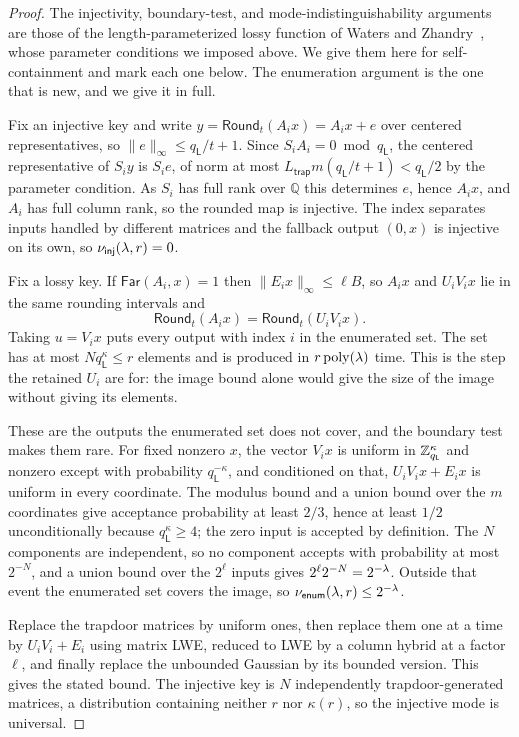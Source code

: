 \begin{proof}
The injectivity, boundary-test, and mode-indistinguishability arguments are those
of the length-parameterized lossy function of Waters and
Zhandry~\cite{C:WatZha24}, whose parameter conditions we imposed above. We give
them here for self-containment and mark each one below. The enumeration argument
is the one that is new, and we give it in full.

 Fix an injective key and write
$y=\mathsf{Round}_t(A_ix)=A_ix+e$ over centered representatives, so
$\|e\|_\infty\le q_{\mathsf L}/t+1$. Since $S_iA_i=0\bmod q_{\mathsf L}$, the
centered representative of $S_iy$ is $S_ie$, of norm at most
$L_{\mathsf{trap}}m(q_{\mathsf L}/t+1)<q_{\mathsf L}/2$ by the parameter
condition. As $S_i$ has full rank over $\mathbb{Q}$ this determines $e$, hence
$A_ix$, and $A_i$ has full column rank, so the rounded map is injective. The
index separates inputs handled by different matrices and the fallback output
$(0,x)$ is injective on its own, so $\nu_{\mathsf{inj}}(\lambda,r)=0$.

 Fix a lossy key. If $\mathsf{Far}(A_i,x)=1$ then
$\|E_ix\|_\infty\le\ell B$, so $A_ix$ and $U_iV_ix$ lie in the same rounding
intervals and
$$
\mathsf{Round}_t(A_ix)=\mathsf{Round}_t(U_iV_ix).
$$
Taking $u=V_ix$ puts every output with index $i$ in the enumerated set. The set
has at most $Nq_{\mathsf L}^{\kappa}\le r$ elements and is produced in
$r\mathop{\rm poly}\nolimits(\lambda)$ time. This is the step the retained $U_i$ are for: the image
bound alone would give the size of the image without giving its elements.

 These are the outputs the enumerated set does not
cover, and the boundary test makes them rare. For fixed nonzero $x$, the vector
$V_ix$ is uniform in $\mathbb Z_{q_{\mathsf L}}^{\kappa}$ and nonzero except with
probability $q_{\mathsf L}^{-\kappa}$, and conditioned on that, $U_iV_ix+E_ix$
is uniform in every coordinate. The modulus bound and a union bound over the $m$
coordinates give acceptance probability at least $2/3$, hence at least $1/2$
unconditionally because $q_{\mathsf L}^{\kappa}\ge4$; the zero input is accepted
by definition. The $N$ components are independent, so no component accepts with
probability at most $2^{-N}$, and a union bound over the $2^{\ell}$ inputs gives
$2^{\ell}2^{-N}=2^{-\lambda}$. Outside that event the enumerated set covers the
image, so $\nu_{\mathsf{enum}}(\lambda,r)\le2^{-\lambda}$.

 Replace the trapdoor matrices by uniform ones,
then replace them one at a time by $U_iV_i+E_i$ using matrix LWE, reduced to LWE
by a column hybrid at a factor $\ell$, and finally replace the unbounded
Gaussian by its bounded version. This gives the stated bound. The injective key
is $N$ independently trapdoor-generated matrices, a distribution containing
neither $r$ nor $\kappa(r)$, so the injective mode is universal.
\end{proof}

